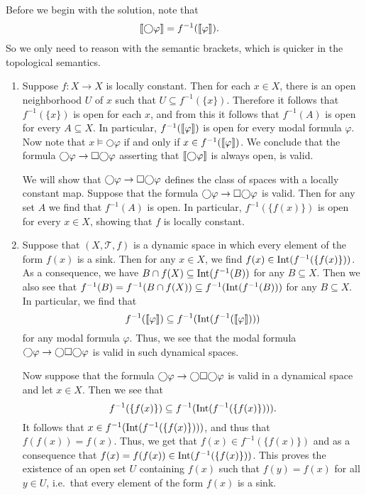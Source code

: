 \documentclass{article}
\newcommand{\topology}{{\mathcal{T}}}
\newcommand{\modalcirc}{{\bigcirc}}
\begin{document}
\begin{ex}
Before we begin with the solution, note that
\begin{align*}
\lsem\modalcirc\varphi\rsem
  & =
f^{-1}(\lsem\varphi\rsem).
\end{align*}
So we only need to reason with the semantic brackets, which is quicker in the
topological semantics.
\begin{enumerate}
\item Suppose $f:X\to X$ is locally constant. Then for
each $x\in X$, there is an open neighborhood $U$ of $x$ such that $U\subseteq f^{-1}(\{x\})$.
Therefore it follows that $f^{-1}(\{x\})$ is open for each $x$, and from this
it follows that $f^{-1}(A)$ is open for every $A\subseteq X$. In particular,
$f^{-1}(\llbracket\varphi\rrbracket)$ is open for every modal formula $\varphi$. Now note
that $x\models\modalcirc\varphi$ if and only if $x\in f^{-1}(\llbracket\varphi\rrbracket)$.
We conclude that the formula $\modalcirc\varphi\to\nec\modalcirc\varphi$ asserting
that $\lsem\modalcirc\varphi\rsem$ is always open, is valid.

We will show that $\modalcirc\varphi\to\nec\modalcirc\varphi$ defines the class of spaces
with a locally constant map. Suppose that the formula $\modalcirc\varphi\to\nec\modalcirc\varphi$
is valid. Then for any set $A$ we find that $f^{-1}(A)$ is open. 
In particular, $f^{-1}(\{f(x)\})$ is open for every $x\in X$, showing that $f$
is locally constant.
\item Suppose that $(X,\topology,f)$ is a dynamic space in which every element
of the form $f(x)$ is a sink. Then for any $x\in X$, we find
$f(x)\in\mathrm{Int}(f^{-1}(\{f(x)\}))$. As a consequence, we have
$B\cap f(X)\subseteq\mathrm{Int}(f^{-1}(B))$ for any $B\subseteq X$. Then we also
see that $f^{-1}(B)=f^{-1}(B\cap f(X))\subseteq f^{-1}(\mathrm{Int}(f^{-1}(B)))$
for any $B\subseteq X$. In particular, we find that
\begin{equation*}
f^{-1}(\llbracket\varphi\rrbracket)\subseteq f^{-1}(\mathrm{Int}(f^{-1}(\llbracket\varphi\rrbracket)))
\end{equation*}
for any modal formula $\varphi$. Thus, we see that the modal formula
$\modalcirc\varphi\to\modalcirc\nec\modalcirc\varphi$ is valid in such dynamical
spaces.

Now suppose that the formula $\modalcirc\varphi\to\modalcirc\nec\modalcirc\varphi$
is valid in a dynamical space and let $x\in X$. Then we see that
\begin{equation*}
f^{-1}(\{f(x)\})\subseteq f^{-1}(\mathrm{Int}(f^{-1}(\{f(x)\}))).
\end{equation*}
It follows that $x\in f^{-1}(\mathrm{Int}(f^{-1}(\{f(x)\})))$, and thus that
$f(f(x))=f(x)$. Thus, we get that $f(x)\in f^{-1}(\{f(x)\})$ and as a consequence that
$f(x)=f(f(x))\in\mathrm{Int}(f^{-1}(\{f(x)\}))$. This proves the existence of an
open set $U$ containing $f(x)$ such that $f(y)=f(x)$ for all $y\in U$, i.e.~that
every element of the form $f(x)$ is a sink.
\end{enumerate}
\end{ex}
\end{document}
